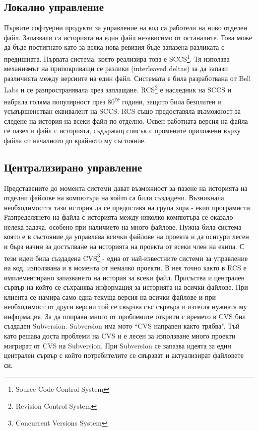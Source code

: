 \documentclass[a4paper]{article}
\begin{document}
  \subsection{Локално управление}
  Първите софтуерни продукти за управление на код са работели на ниво отделен
  файл. Запазвали са историята на един файл независимо от останалите.  Това
  може да бъде постигнато като за всяка нова ревизия бъде запазена разликата
  с предишната. Първата система, която реализира това е SCCS\footnote{Source
  Code Control System\cite{sccs}}. Тя използва механизмът на припокриващи се
  разлики (interleaved deltas) за да запази различията между версиите на един
  файл. Системата е била разработвана от Bell Labs и се разпространявала чрез
  заплащане. RCS\footnote{Revision Control System\cite{rcs}} е наследник на
  SCCS и набрала голяма популярност през 80\textsuperscript{те} години, защото
  била безплатен и усъвършенстван еквивалент на SCCS. RCS също предоставяла
  възможност за следене на история на всеки файл по отделно. Освен работната
  версия на файла се пазел и файл с историята, съдържащ списък с промените
  приложени върху файла от началното до крайното му състояние.

  \subsection{Централизирано управление} Представените до момента системи дават
  възможност за пазене на историята на отделни файлове на компютъра на който са
  били създадени. Възникнала необходимостта тази история да се предоставя на
  група хора - екип програмисти. Разпределянето на файла с историята между
  няколко компютъра се оказало нелека задача, особено при наличието на много
  файлове. Нужна била система която е в състояние да управлява всички файлове
  на проекта и да осигури лесен и бърз начин за достъпване на историята на
  проекта от всеки член на екипа. С тези идеи била създадена
  CVS\footnote{Concurrent Versions System\cite{cvs}} - една от най-известните
  системи за управление на код, използвана и в момента от немалко проекти.
  В нея точно както в RCS е имплементирано запазването на история за всеки
  файл. Присъства и централен сървър на който се съхранява информация за
  историята на всички файлове. При клиента се намира само една текуща версия на
  всички файлове и при необходимост от други версии той се свързва със сървъра
  и изтегля нужната му информация. За да поправи много от проблемите открити
  с времето в CVS бил създаден Subversion\cite{svn}. Subversion има мото ``CVS
  направен както трябва''. Тъй като решава доста проблеми на CVS и е лесен за
  използване много проекти мигрират от CVS на Subversion. При Subversion се
  запазва идеята за един централен сървър с който потребителите се свързват
  и актуализират файловете си.
\end{document}
